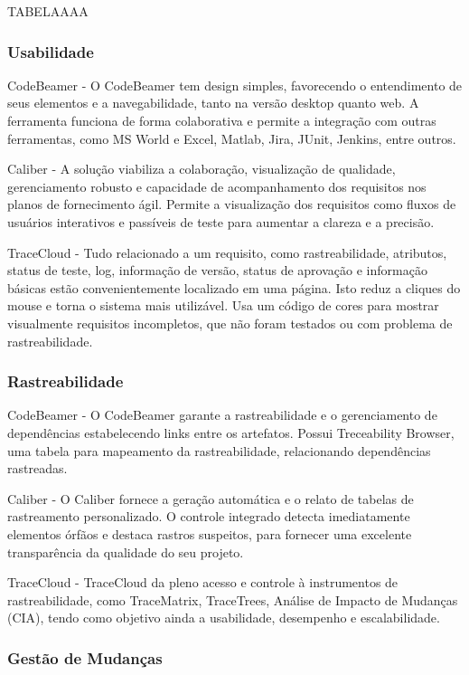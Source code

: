 TABELAAAA

\subsubsection{Usabilidade}

CodeBeamer - O CodeBeamer tem design simples, favorecendo o entendimento de seus elementos e a navegabilidade, tanto na versão desktop quanto web. A ferramenta funciona de forma colaborativa e permite a integração com outras ferramentas, como MS World e Excel, Matlab, Jira, JUnit, Jenkins, entre outros.

Caliber - A solução viabiliza a colaboração, visualização de qualidade, gerenciamento robusto e capacidade de acompanhamento dos requisitos nos planos de fornecimento ágil. Permite a visualização dos requisitos como fluxos de usuários interativos e passíveis de teste para aumentar a clareza e a precisão.

TraceCloud - Tudo relacionado a um requisito, como rastreabilidade, atributos, status de teste, log, informação de versão, status de aprovação e informação básicas estão convenientemente localizado em uma página. Isto reduz a cliques do mouse e torna o sistema mais utilizável. Usa um código de cores para mostrar visualmente requisitos incompletos, que não foram testados ou com problema de rastreabilidade.

\subsubsection{Rastreabilidade}

CodeBeamer - O CodeBeamer garante a rastreabilidade e o gerenciamento de dependências estabelecendo links entre os artefatos. Possui Treceability Browser, uma tabela para mapeamento da rastreabilidade, relacionando dependências rastreadas.

Caliber - O Caliber fornece a geração automática e o relato de tabelas de rastreamento personalizado. O controle integrado detecta imediatamente elementos órfãos e destaca rastros suspeitos, para fornecer uma excelente transparência da qualidade do seu projeto.

TraceCloud - TraceCloud da pleno acesso e controle à instrumentos de rastreabilidade, como TraceMatrix, TraceTrees, Análise de Impacto de Mudanças (CIA), tendo como objetivo ainda a usabilidade, desempenho e escalabilidade.

\subsubsection{Gestão de Mudanças}

